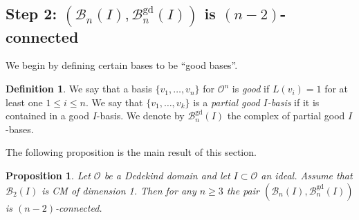 \documentclass[11 pt]{article}
\theoremstyle{plain}
\newtheorem{proposition}[theorem]{Proposition}
\theoremstyle{definition}
\newtheorem{definition}[theorem]{Definition}
\numberwithin{equation}{section}
\renewcommand{\O}{\mathcal{O}}
\newcommand\PartialBases{\ensuremath{\mathcal{B}}}
\newcommand{\PB}{\PartialBases}
\newcommand{\PartialBasesGood}{\PartialBases^{\text{gd}}}
\newcommand{\PBg}{\PartialBasesGood}
\begin{document}
\subsection{Step 2: \texorpdfstring{$(\PB_n(I),\PBg_n(I))$}{(Bn(I),Bn-good(I))} is \texorpdfstring{$(n-2)$-connected}{(n-2)-connected}}
\label{section:step2}

We begin by defining certain bases to be ``good bases''.

\begin{definition}
\label{def:good}
We say that a basis $\{v_1,\ldots,v_n\}$ for $\O^n$ is \emph{good} if $L(v_i)=1$ for at least one $1\leq i\leq n$. We say that $\{v_1,\ldots,v_k\}$ is a \emph{partial good $I$-basis} if it is contained in a good $I$-basis. We denote by $\PBg_n(I)$ the complex of partial good $I$-bases.
\end{definition}

The following proposition is the main result of this section.

\begin{proposition}
\label{prop:BBprime}
Let $\O$ be a Dedekind domain and let $I\subset \O$ an ideal. Assume that $\PB_2(I)$ is CM of dimension 1. Then for any $n\geq 3$ the pair $(\PB_n(I),\PBg_n(I))$ is $(n-2)$-connected.
\end{proposition}
\end{document}

